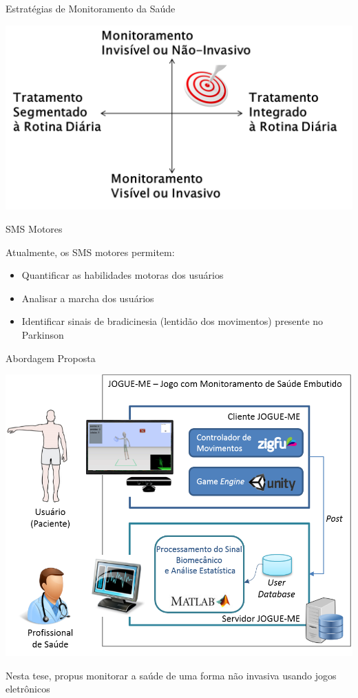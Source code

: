 \documentclass{beamer}
\begin{document}
\begin{frame}{Estratégias de Monitoramento da Saúde}
  \begin{block}{}
      \center \includegraphics[height=2.2 in]{img/estrategmonitorament.png}
  \end{block}
\end{frame}


\begin{frame}{SMS Motores}  
  \begin{block}{}  
  Atualmente, os SMS motores permitem:  
    \begin{itemize}
    \item Quantificar as habilidades motoras dos usuários~\cite{manumeterjbhi2014,patel_monitoring_2009}
    \item Analisar a marcha dos usuários~\cite{robotgait2014}
    \item Identificar sinais de bradicinesia (lentidão dos movimentos) presente no Parkinson~\cite{ambulatoryparkinson2010}
    \end{itemize}   
  \end{block}   
\end{frame}

\begin{frame}{Abordagem Proposta}
  \begin{block}{}
      \center \includegraphics[height=1.8 in]{img/visaosistema.png}
  \end{block}
  \begin{block}{}
Nesta tese, propus monitorar a saúde de uma forma não invasiva usando jogos eletrônicos
  \end{block}
\end{frame}
\end{document}
